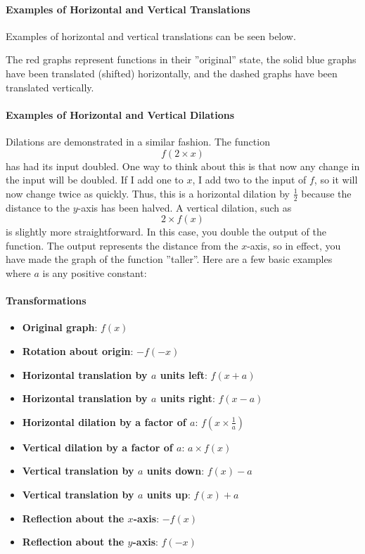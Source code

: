 \paragraph{Examples of Horizontal and Vertical Translations}

Examples of horizontal and vertical translations can be seen below. 


The red graphs represent functions in their ''original'' state, the solid blue graphs have been translated (shifted) horizontally, and the dashed graphs have been translated vertically.

\paragraph{Examples of Horizontal and Vertical Dilations}


Dilations are demonstrated in a similar fashion. The function
$$
f(2 \times x)
$$
has had its input doubled. One way to think about this is that now any change in the input will be doubled. If I add one to $x$, I add two to the input of $f$, so it will now change twice as quickly. Thus, this is a horizontal dilation by $\frac{1}{2}$ because the distance to the $y$-axis has been halved. A vertical dilation, such as
$$
2 \times f(x)
$$
is slightly more straightforward. In this case, you double the output of the function. The output represents the distance from the $x$-axis, so in effect, you have made the graph of the function ''taller''. Here are a few basic examples where $a$ is any positive constant:

\paragraph{Transformations}

\begin{itemize}
    \item \textbf{Original graph}: $f(x)$
    \item \textbf{Rotation about origin}: $-f(-x)$
    \item \textbf{Horizontal translation by $a$ units left}: $f(x + a)$
    \item \textbf{Horizontal translation by $a$ units right}: $f(x - a)$
    \item \textbf{Horizontal dilation by a factor of $a$}: $f\left(x \times \frac{1}{a}\right)$
    \item \textbf{Vertical dilation by a factor of $a$}: $a \times f(x)$
    \item \textbf{Vertical translation by $a$ units down}: $f(x) - a$
    \item \textbf{Vertical translation by $a$ units up}: $f(x) + a$
    \item \textbf{Reflection about the $x$-axis}: $-f(x)$
    \item \textbf{Reflection about the $y$-axis}: $f(-x)$
\end{itemize}

